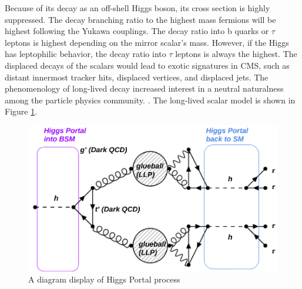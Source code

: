 Because of its decay as an off-shell Higgs boson, its cross section is highly suppressed.
The decay branching ratio to the highest mass fermions will be highest following the Yukawa couplings.
The decay ratio into b quarks or $\tau$ leptons is highest depending on the mirror scalar's mass.
However, if the Higgs has leptophilic behavior, the decay ratio into $\tau$ leptons is always the highest.
The displaced decays of the scalars would lead to exotic signatures in CMS, such as distant innermost tracker hits, displaced vertices, and displaced jets.
The phenomenology of long-lived decay increased interest in a neutral naturalness among the particle physics community. \cite{Curtin:2015fna,Csaki:2015fba}.
The long-lived scalar model is shown in Figure \ref{fig:HiggsPortal}.



\begin{figure}[h!]
  \caption{A diagram display of Higgs Portal process}
  \label{fig:HiggsPortal}
  \centering
  \includegraphics[width=0.87\linewidth]{figs/TwinHiggs.png}
\end{figure}
